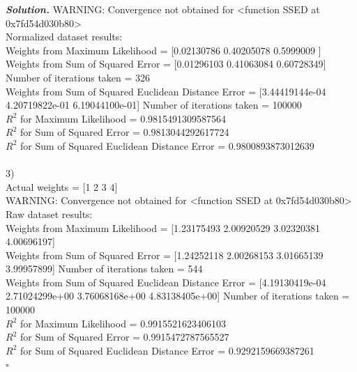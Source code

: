 \documentclass[8pt]{article}
\newenvironment{solution}[1][\it{Solution}]{\textbf{#1. } }{$\square$}
\begin{document}
\begin{solution}
WARNING: Convergence not obtained for <function SSED at 0x7fd54d030b80>\\
Normalized dataset results:\\
Weights from Maximum Likelihood = [0.02130786 0.40205078 0.5999009 ] \\
Weights from Sum of Squared Error = [0.01296103 0.41063084 0.60728349] Number of iterations taken =  326 \\
Weights from Sum of Squared Euclidean Distance Error = [3.44419144e-04 4.20719822e-01 6.19044100e-01] Number of iterations taken =  100000 \\
$R^2$ for Maximum Likelihood = 0.9815491309587564 \\
$R^2$ for Sum of Squared Error = 0.9813044292617724 \\
$R^2$ for Sum of Squared Euclidean Distance Error = 0.9800893873012639 \\
\\
3)\\
Actual weights =  [1 2 3 4] \\
WARNING: Convergence not obtained for <function SSED at 0x7fd54d030b80>\\
Raw dataset results:\\
Weights from Maximum Likelihood = [1.23175493 2.00920529 3.02320381 4.00696197] \\
Weights from Sum of Squared Error = [1.24252118 2.00268153 3.01665139 3.99957899] Number of iterations taken =  544 \\
Weights from Sum of Squared Euclidean Distance Error = [4.19130419e-04 2.71024299e+00 3.76068168e+00 4.83138405e+00] Number of iterations taken =  100000 \\
$R^2$ for Maximum Likelihood = 0.9915521623406103 \\
$R^2$ for Sum of Squared Error = 0.9915472787565527 \\
$R^2$ for Sum of Squared Euclidean Distance Error = 0.9292159669387261 \\


\end{solution}
\end{document}
